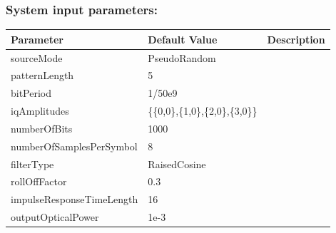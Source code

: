 \subsubsection{System input parameters:}
\begin{center}
	\begin{tabular}{ |p{5cm}||p{4.5cm}|p{4.5cm}|  }
		\hline
		\textbf{Parameter} &  \textbf{Default Value} & \textbf{Description}\\
		\hline
		sourceMode    & PseudoRandom &\\
		\hline
		patternLength & 5      & \\
		\hline
		bitPeriod     & 1/50e9 & \\
		\hline
		iqAmplitudes  &\{\{0,0\},\{1,0\},\{2,0\},\{3,0\}\} &\\
		\hline
		numberOfBits  &   1000 & \\
		\hline
		numberOfSamplesPerSymbol& 8  &\\
		\hline
		filterType& RaisedCosine  &\\
		\hline
		rollOffFactor & 0.3    & \\
		\hline
		impulseResponseTimeLength&16&\\
		\hline
		outputOpticalPower&1e-3&\\
		\hline
	\end{tabular}
\end{center}
\vspace{0cm}
